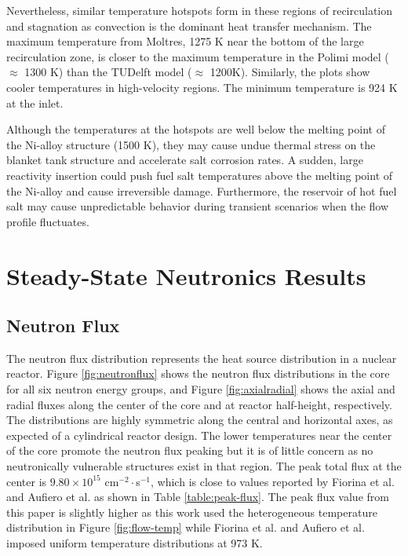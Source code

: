 Nevertheless, similar temperature hotspots form in these regions of
recirculation and stagnation as convection is the dominant heat transfer
mechanism. The maximum temperature from Moltres, 1275 K near the bottom of the
large recirculation zone, is closer to the maximum temperature in the Polimi
model ($\approx$ 1300 K) than the TUDelft model ($\approx$ 1200K). Similarly,
the plots show cooler temperatures in high-velocity regions. The minimum
temperature is 924 K at the inlet. 

Although the temperatures at the hotspots are well below the melting point of
the Ni-alloy structure (1500 K), they may cause undue thermal stress on the
blanket tank structure and accelerate salt corrosion rates. A
sudden, large reactivity insertion could push fuel salt temperatures above the
melting point of the Ni-alloy and cause irreversible damage. Furthermore,
the reservoir of hot fuel salt may cause unpredictable behavior during
transient scenarios when the flow profile fluctuates.

\section{Steady-State Neutronics Results}

\subsection{Neutron Flux}

The neutron flux distribution represents the heat source distribution in a
nuclear reactor. Figure \ref{fig:neutronflux} shows the neutron flux
distributions in the core for all six neutron energy groups, and Figure
\ref{fig:axialradial} shows the axial and radial fluxes along the center of
the core and at reactor half-height, respectively.
The distributions are highly symmetric along the
central and horizontal axes, as expected of a cylindrical reactor design. The
lower temperatures near the center of the core promote the neutron
flux peaking but it is of little concern as no neutronically vulnerable
structures exist in that region. The peak total flux at the center is
$9.80 \times 10^{15}$ cm$^{-2}\cdot$s$^{-1}$, which is close to values
reported by Fiorina et al. \cite{fiorina_molten_2013} and Aufiero et al.
\cite{aufiero_development_2014} as shown in Table \ref{table:peak-flux}. The
peak flux value from this paper is slightly higher as this work used the
heterogeneous temperature distribution in Figure \ref{fig:flow-temp} while
Fiorina et al. and Aufiero et al. imposed uniform temperature distributions
at 973 K.

